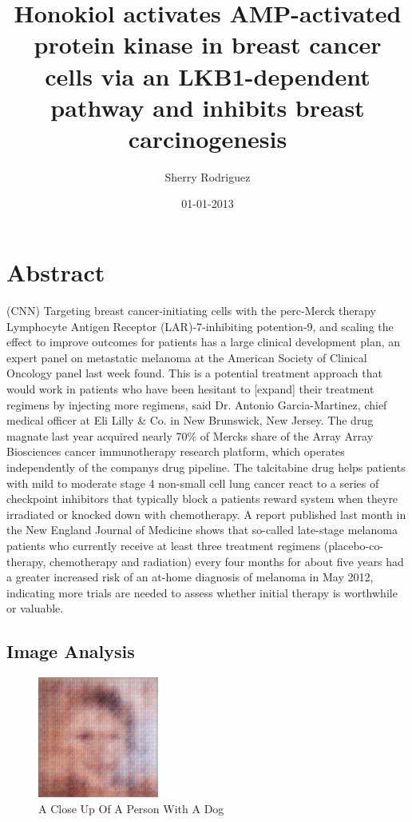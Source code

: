 \documentclass{article}%
\title{Honokiol activates AMP{-}activated protein kinase in breast cancer cells via an LKB1{-}dependent pathway and inhibits breast carcinogenesis}%
\author{Sherry Rodriguez}%
\affil{Department of Oral Biology and Pathology, School of Dental Medicine, Stony Brook University, Stony Brook, New York, United States of America}%
\date{01{-}01{-}2013}%
\begin{document}
%
\normalsize%
\maketitle%
\section{Abstract}%
\label{sec:Abstract}%
(CNN)  Targeting breast cancer{-}initiating cells with the perc{-}Merck therapy Lymphocyte Antigen Receptor (LAR){-}7{-}inhibiting potention{-}9, and scaling the effect to improve outcomes for patients has a large clinical development plan, an expert panel on metastatic melanoma at the American Society of Clinical Oncology panel last week found.\newline%
This is a potential treatment approach that would work in patients who have been hesitant to {[}expand{]} their treatment regimens by injecting more regimens, said Dr. Antonio Garcia{-}Martinez, chief medical officer at Eli Lilly \& Co. in New Brunswick, New Jersey.\newline%
The drug magnate last year acquired nearly 70\% of Mercks share of the Array Array Biosciences cancer immunotherapy research platform, which operates independently of the companys drug pipeline.\newline%
The talcitabine drug helps patients with mild to moderate stage 4 non{-}small cell lung cancer react to a series of checkpoint inhibitors that typically block a patients reward system when theyre irradiated or knocked down with chemotherapy.\newline%
A report published last month in the New England Journal of Medicine shows that so{-}called late{-}stage melanoma patients who currently receive at least three treatment regimens (placebo{-}co{-} therapy, chemotherapy and radiation) every four months for about five years had a greater increased risk of an at{-}home diagnosis of melanoma in May 2012, indicating more trials are needed to assess whether initial therapy is worthwhile or valuable.

%
\subsection{Image Analysis}%
\label{subsec:ImageAnalysis}%


\begin{figure}[h!]%
\centering%
\includegraphics[width=150px]{500_fake_images/samples_5_390.png}%
\caption{A Close Up Of A Person With A Dog}%
\end{figure}

%
\end{document}

